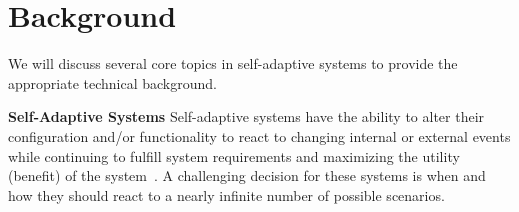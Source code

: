 \documentclass[11pt]{proposalnsf}
\newcommand{\dan}[1]{\textcolor{blue}{{\it [Dan says: #1]}}}
\newlength\q %
\begin{document}
\begin{sloppypar}







\section{Background}
We will discuss several core topics in self-adaptive systems to provide the appropriate technical background.

\vspace{3mm} \noindent \textbf{Self-Adaptive Systems} Self-adaptive systems have the ability to alter their configuration and/or functionality to react to changing internal or external events while continuing to fulfill system requirements and maximizing the utility (benefit) of the system~\cite{moreno2017decision}. A challenging decision for these systems is when and how they should react to a nearly infinite number of possible scenarios. %



\end{sloppypar}
\end{document}
